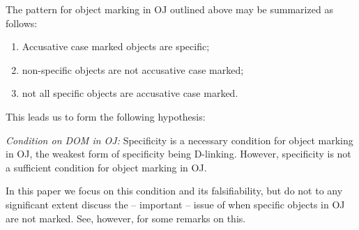 \documentclass[output=paper]{LSP/langsci}
\begin{document}
The pattern for object marking in OJ   outlined above may be summarized as follows:

\begin{exe}
\ex%
\label{07-fr-ex:6}
\renewcommand{\labelenumi}{\alph{enumi}}
\begin{enumerate}
\item \label{07-fr-ex:6a} Accusative case marked objects are specific;
\item \label{07-fr-ex:6b} non-specific objects are not accusative case marked;
\item \label{07-fr-ex:6c} not all specific objects are accusative case marked.
\end{enumerate}
\end{exe}

This leads us to form the following hypothesis: 

\begin{exe}
\ex%
\label{07-fr-ex:7}
\textit{Condition on DOM in OJ:} Specificity is a necessary
condition for object marking in OJ, the weakest form of specificity
being D-linking. However, specificity is not a sufficient condition
for object marking in OJ.
\end{exe}

In this paper we focus on this condition and its falsifiability, but
do not to any significant extent discuss the – important – issue of
when specific objects in OJ   are not  marked. See,
however,  for some remarks on this.
\end{document}
